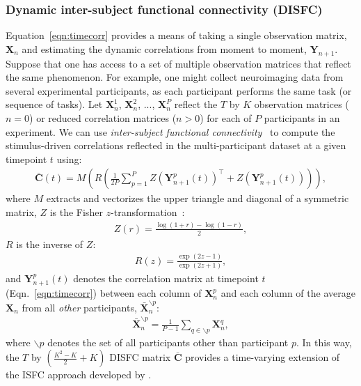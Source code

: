 \documentclass[english]{article}
\begin{document}
\subsubsection*{Dynamic inter-subject functional connectivity (DISFC)}
Equation~\ref{eqn:timecorr} provides a means of taking a single
observation matrix, $\mathbf{X}_n$ and estimating the dynamic
correlations from moment to moment, $\mathbf{Y}_{n+1}$.  Suppose that
one has access to a set of multiple observation matrices that reflect
the same phenomenon.  For example, one might collect neuroimaging data
from several experimental participants, as each participant performs
the same task (or sequence of tasks).  Let $\mathbf{X}_n^1$,
$\mathbf{X}_n^2$, ..., $\mathbf{X}_n^P$ reflect the $T$ by $K$
observation matrices ($n = 0$) or reduced correlation matrices
($n > 0$) for each of $P$ participants in an experiment.  We can use
\textit{inter-subject functional connectivity}~\citep[ISFC;
][]{SimoEtal16, SimoChan20} to compute the stimulus-driven correlations reflected
in the multi-participant dataset at a given timepoint $t$ using:
\begin{align}
\bar{\mathbf{C}}(t) = M\left(R\left(\frac{1}{2P} \sum_{p=1}^P
  Z\left(\mathbf{Y}_{n+1}^p(t)\right)^\top + Z\left(\mathbf{Y}_{n+1}^p(t)\right)\right)\right),\label{eqn:disfc}
\end{align}
where $M$ extracts and vectorizes the upper triangle and diagonal of a symmetric
matrix, $Z$ is the Fisher $z$-transformation~\citep{Zar10}:
\begin{align}
Z(r) = \frac{\log(1+r) - \log(1-r)}{2},
\end{align}
$R$ is the inverse of $Z$:
\begin{align}
R(z) = \frac{\exp(2z - 1)}{\exp(2z + 1)},
\end{align}
and $\mathbf{Y}_{n+1}^p(t)$ denotes the correlation matrix at timepoint $t$
(Eqn.~\ref{eqn:timecorr}) between each column of $\mathbf{X}_n^p$ and each
column of the average $\mathbf{X}_n$ from all \textit{other}
participants, $\bar{\mathbf{X}}_n^{ \backslash p}$:
\begin{align}
  \bar{\mathbf{X}}_n^{ \backslash p} = \frac{1}{P-1}\sum_{q \in
  \backslash p} \mathbf{X}_n^q,
\end{align}
where $\backslash p$ denotes the set of all participants other than
participant $p$. In this way, the $T$ by $\left( \frac{K^2 - K}{2} + K \right)$ DISFC
matrix $\bar{\mathbf{C}}$ provides a time-varying extension of the ISFC
approach developed by \cite{SimoEtal16}.
\end{document}

